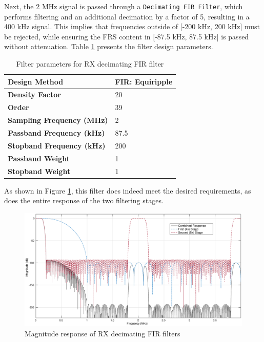 Next, the 2 MHz signal is passed through a \texttt{Decimating FIR Filter},
which performs filtering and an additional decimation by a factor of 5,
resulting in a 400 kHz signal. This implies that frequencies outside of
[-200 kHz, 200 kHz] must be rejected, while ensuring the \ac{FRS} content in
[-87.5 kHz, 87.5 kHz] is passed without attenuation. Table \ref{tab:rx_dec_fir}
presents the filter design parameters.

\begin{table}[h]
  \centering
  \caption{Filter parameters for RX decimating FIR filter}
  \label{tab:rx_dec_fir}
  \footnotesize
  \begin{tabular} {|l|l|}
    \hline
    \textbf{Design Method}              & FIR: Equiripple \\ \hline
    \textbf{Density Factor}             & 20              \\ \hline
    \textbf{Order}                      & 39              \\ \hline
    \textbf{Sampling Frequency (MHz)}   & 2               \\ \hline
    \textbf{Passband Frequency (kHz)}   & 87.5            \\ \hline
    \textbf{Stopband Frequency (kHz)}   & 200             \\ \hline
    \textbf{Passband Weight}            & 1               \\ \hline
    \textbf{Stopband Weight}            & 1               \\ \hline
  \end{tabular}
\end{table}

As shown in Figure \ref{fig:rx_firs}, this filter does indeed meet the
desired requirements, as does the entire response of the two filtering stages.

\begin{figure}[h!]
  \centering
  \includegraphics[width=6.5in]{images/frs/filter/rx/dec-firs.eps}
  \caption{Magnitude response of RX decimating FIR filters}
  \label{fig:rx_firs}
\end{figure}

